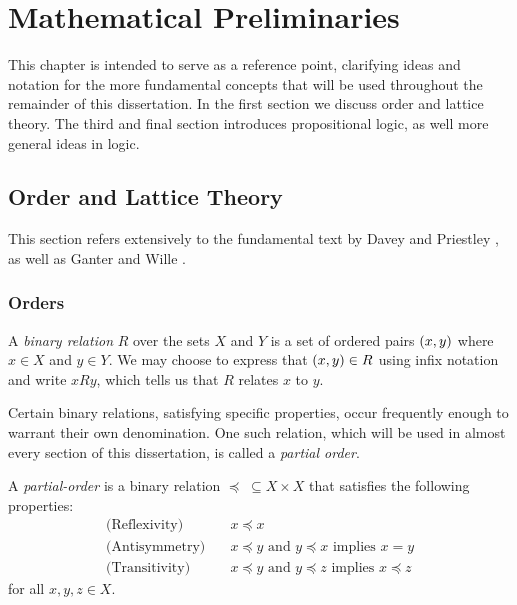 \chapter{Mathematical Preliminaries}
\label{chapter:mathematical-preliminaries}

This chapter is intended to serve as a reference point, clarifying ideas and notation for the more fundamental concepts that will be used throughout the remainder of this dissertation. In the first
section we discuss order and lattice theory. The third and final section introduces propositional logic, as well more general ideas in logic.

\section{Order and Lattice Theory}
\label{section:order-theory}

This section refers extensively to the fundamental text by Davey and Priestley \cite{davey2002introduction}, as well as Ganter and Wille \cite{ganter1999formal}.

\subsection{Orders}
\label{subsection:orders}

A \textit{binary relation}  $R$ over the sets $X$ and $Y$ is a set of ordered pairs $(x,y)$ where $x \in X$ and $y \in Y$. We may choose to express that $(x,y)\in R$ using
infix notation and write $xRy$, which tells us that $R$ relates $x$ to $y$.

Certain binary relations, satisfying specific properties, occur frequently enough to warrant their own denomination. One such relation, which will be used in almost every section of this dissertation,
is called a \textit{partial order}.

\begin{definition}
  \label{definition:partial-order} A \textit{partial-order}  is a binary relation $\preceq \; \subseteq X \times X$ that satisfies the following properties:
  \begin{align}
    \text{(Reflexivity)}\quad  & x \preceq x                                                     \\
    \text{(Antisymmetry)}\quad & x \preceq y \text{ and }y \preceq x \text{ implies }x = y       \\
    \text{(Transitivity)}\quad & x \preceq y \text{ and }y \preceq z \text{ implies }x \preceq z
  \end{align}
  for all $x,y,z \in X$.
\end{definition}

